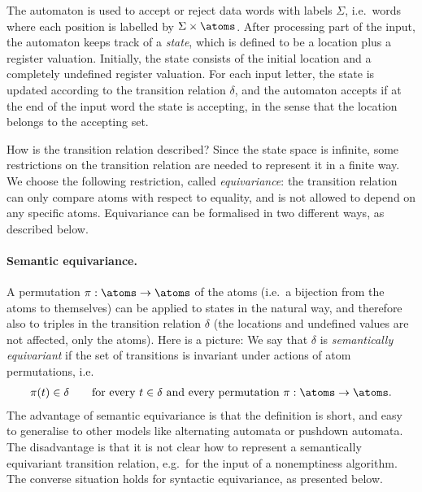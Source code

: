 The automaton is used to accept or reject data words with labels $\Sigma$, i.e.~words where each position is labelled by $\Sigma \times \atoms$. After processing part of the input, the automaton keeps track of a \emph{state}, which is defined to be a location plus a register valuation. Initially, the state consists of the initial location and a completely undefined register valuation. For each input letter, the state is updated according to the transition relation $\delta$, and the automaton accepts if at the end of the input word the state is accepting, in the sense that the location belongs to the accepting set.

How is the transition relation described? Since the state space is infinite, some restrictions on the transition relation are needed to represent it in a finite way. We choose the following restriction, called \emph{equivariance}: the transition relation can only compare atoms with respect to equality, and is not allowed to depend on any specific atoms. Equivariance can be formalised in two different ways, as described below.

\paragraph{Semantic equivariance.} A permutation $\pi : \atoms \to \atoms$ of the atoms (i.e.~a bijection from the atoms to themselves) can be applied to states in the natural way, and therefore also to triples in the transition relation $\delta$ (the locations and undefined values are not affected, only the atoms). Here is a picture:
We say that $\delta$ is \emph{semantically equivariant} if the set of transitions is invariant under actions of atom permutations, i.e.
\begin{align*}
 \pi(t)\in \delta \qquad \mbox{for every $t \in \delta$ and every permutation $\pi : \atoms \to \atoms$}.
\end{align*}
The advantage of semantic equivariance is that the definition is short, and easy to generalise to other models like alternating automata or pushdown automata. The disadvantage is that it is not clear how to represent a semantically equivariant transition relation, e.g.~for the input of a nonemptiness algorithm. The converse situation holds for syntactic equivariance, as presented below.
